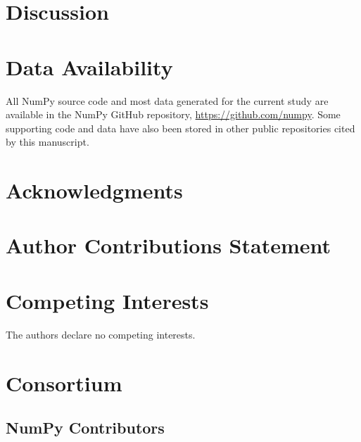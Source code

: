 \documentclass[fleqn,10pt]{wlscirep}
\begin{document}
\section*{Discussion}



\section*{Data Availability}
All NumPy source code and most data generated for the current study are available in the NumPy GitHub repository, \url{https://github.com/numpy}. Some supporting code and data have also been stored in other public repositories cited by this manuscript.



\section*{Acknowledgments}


\section*{Author Contributions Statement}




\section*{Competing Interests}

The authors declare no competing interests.




\section*{Consortium}
\subsection*{NumPy Contributors}

\end{document}
